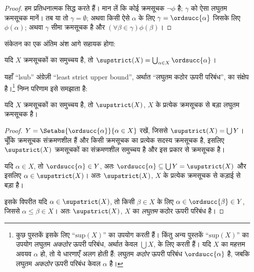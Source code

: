 \documentclass[../../../include/open-logic-section]{subfiles}
\begin{document}
\begin{proof}
हम प्रतिधनात्मक सिद्ध करते हैं। मान लें कि कोई क्रमसूचक $\lnot\phi$ है;
$\gamma$ को ऐसा लघुतम क्रमसूचक मानें। तब या तो $\gamma = \emptyset$; अथवा
किसी ऐसे $\alpha$ के लिए $\gamma = \ordsucc{\alpha}$ जिसके लिए
$\phi(\alpha)$; अथवा $\gamma$ सीमा क्रमसूचक है और
$(\forall \beta \in \gamma)\phi(\beta)$।
\end{proof}
\noindent
संकेतन का एक अंतिम अंश आगे सहायक होगा:

\begin{defn}
यदि $X$ क्रमसूचकों का समुच्चय है, तो
$\supstrict(X) = \bigcup_{\alpha \in X} \ordsucc{\alpha}$।
\end{defn}
\noindent
यहाँ ``lsub'' अंग्रेज़ी ``least strict upper bound'', अर्थात ``लघुतम कठोर
ऊपरी परिबंध'', का संक्षेप है।\footnote{कुछ पुस्तकें इसके लिए
``$\text{sup}(X)$'' का उपयोग करती हैं। किंतु अन्य पुस्तकें
``$\text{sup}(X)$'' का उपयोग लघुतम \emph{अकठोर} ऊपरी परिबंध, अर्थात केवल
$\bigcup X$, के लिए करती हैं। यदि $X$ का महत्तम अवयव $\alpha$ हो, तो ये
धारणाएँ अलग होती हैं: लघुतम \emph{कठोर} ऊपरी परिबंध $\ordsucc{\alpha}$ है,
जबकि लघुतम \emph{अकठोर} ऊपरी परिबंध केवल $\alpha$ है।} निम्न परिणाम इसे
समझाता है:

\begin{prop}
यदि $X$ क्रमसूचकों का समुच्चय है, तो $\supstrict(X)$, $X$ के प्रत्येक
क्रमसूचक से बड़ा लघुतम क्रमसूचक है।
\end{prop}

\begin{proof}
$Y = \Setabs{\ordsucc{\alpha}}{\alpha \in X}$ रखें, जिससे
$\supstrict(X) = \bigcup Y$। चूँकि क्रमसूचक संक्रमणशील हैं और किसी क्रमसूचक
का प्रत्येक सदस्य क्रमसूचक है, इसलिए $\supstrict(X)$ क्रमसूचकों का
संक्रमणशील समुच्चय है और इस प्रकार  से
क्रमसूचक है।

यदि $\alpha \in X$, तो $\ordsucc{\alpha} \in Y$, अतः
$\ordsucc{\alpha} \subseteq \bigcup Y = \supstrict(X)$ और इसलिए
$\alpha \in \supstrict(X)$। अतः $\supstrict(X)$, $X$ के प्रत्येक
क्रमसूचक से कड़ाई से बड़ा है।

इसके विपरीत यदि $\alpha \in \supstrict(X)$, तो किसी $\beta \in X$ के लिए
$\alpha \in \ordsucc{\beta} \in Y$, जिससे $\alpha \leq \beta \in X$।
अतः $\supstrict(X)$, $X$ का \emph{लघुतम} कठोर ऊपरी परिबंध है।
\end{proof}
\end{document}
